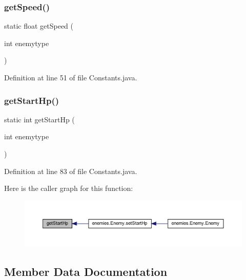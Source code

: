 \subsubsection{\texorpdfstring{get\+Speed()}{getSpeed()}}
{\footnotesize\ttfamily static float get\+Speed (\begin{DoxyParamCaption}\item[{int}]{enemytype }\end{DoxyParamCaption})\hspace{0.3cm}{\ttfamily [static]}}



Definition at line 51 of file Constants.\+java.

\mbox{\label{classhelpz_1_1_constants_1_1_enemy_af1c8177a32688b808a404068598de756}} 
\subsubsection{\texorpdfstring{get\+Start\+Hp()}{getStartHp()}}
{\footnotesize\ttfamily static int get\+Start\+Hp (\begin{DoxyParamCaption}\item[{int}]{enemytype }\end{DoxyParamCaption})\hspace{0.3cm}{\ttfamily [static]}}



Definition at line 83 of file Constants.\+java.

Here is the caller graph for this function\+:\nopagebreak
\begin{figure}[H]
\begin{center}
\leavevmode
\includegraphics[width=350pt]{classhelpz_1_1_constants_1_1_enemy_af1c8177a32688b808a404068598de756_icgraph}
\end{center}
\end{figure}


\subsection{Member Data Documentation}
\mbox{\label{classhelpz_1_1_constants_1_1_enemy_a843c875dde508da3c70f72c4ddc578e8}} 
